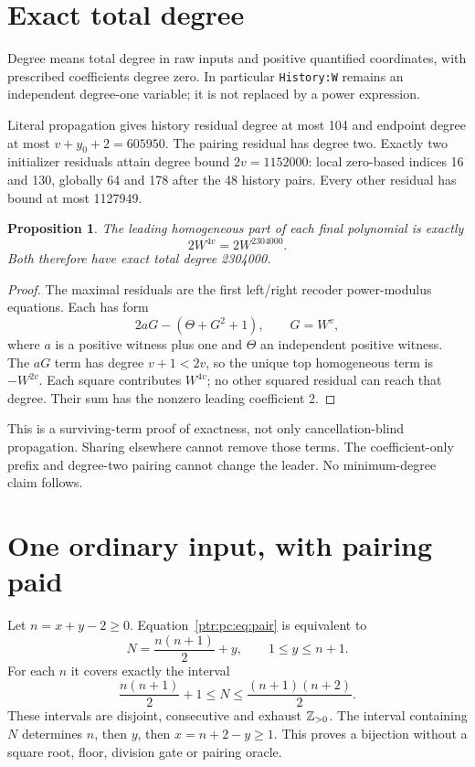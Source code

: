 \documentclass[11pt,letterpaper]{article}
\newtheorem{proposition}[theorem]{Proposition}
\theoremstyle{definition}\newtheorem{definition}[theorem]{Definition}
\theoremstyle{remark}\newtheorem{remark}[theorem]{Remark}
\newcommand{\codeu}[1]{\nolinkurl{#1}}
\begin{document}
\section{Exact total degree}\label{ptr:pc:sec:degree}
Degree means total degree in raw inputs and positive quantified coordinates, with prescribed coefficients degree zero. In particular \codeu{History:W} remains an independent degree-one variable; it is not replaced by a power expression.

Literal propagation gives history residual degree at most 104 and endpoint degree at most $v+y_0+2=605950$. The pairing residual has degree two. Exactly two initializer residuals attain degree bound $2v=1152000$: local zero-based indices 16 and 130, globally 64 and 178 after the 48 history pairs. Every other residual has bound at most 1127949.
\begin{proposition}
The leading homogeneous part of each final polynomial is exactly
\[
 2W^{4v}=2W^{2304000}.
\]
Both therefore have exact total degree 2304000.
\end{proposition}
\begin{proof}
The maximal residuals are the first left/right recoder power-modulus equations. Each has form
\[
 2aG-(\Theta+G^2+1),\qquad G=W^v,
\]
where $a$ is a positive witness plus one and $\Theta$ an independent positive witness. The $aG$ term has degree $v+1<2v$, so the unique top homogeneous term is $-W^{2v}$. Each square contributes $W^{4v}$; no other squared residual can reach that degree. Their sum has the nonzero leading coefficient 2.
\end{proof}
This is a surviving-term proof of exactness, not only cancellation-blind propagation. Sharing elsewhere cannot remove those terms. The coefficient-only prefix and degree-two pairing cannot change the leader. No minimum-degree claim follows.

\section{One ordinary input, with pairing paid}\label{ptr:pc:sec:pairing}
Let $n=x+y-2\ge0$. Equation~\eqref{ptr:pc:eq:pair} is equivalent to
\[
 N=\frac{n(n+1)}2+y,\qquad 1\le y\le n+1.
\]
For each $n$ it covers exactly the interval
\[
 \frac{n(n+1)}2+1\le N\le\frac{(n+1)(n+2)}2.
\]
These intervals are disjoint, consecutive and exhaust $\mathbb Z_{>0}$. The interval containing $N$ determines $n$, then $y$, then $x=n+2-y\ge1$. This proves a bijection without a square root, floor, division gate or pairing oracle.
\end{document}
